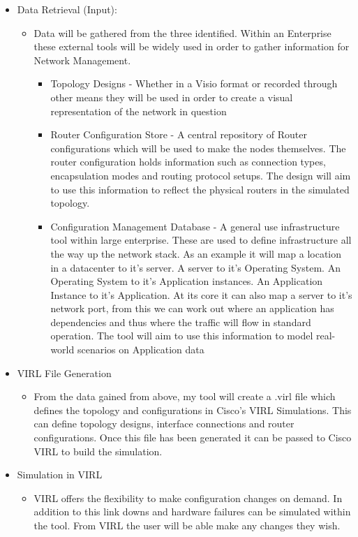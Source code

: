 \documentclass[11pt]{report}
\begin{document}
\begin{itemize}
\item{Data Retrieval (Input):}
  \begin{itemize}
    \item{Data will be gathered from the three identified. Within an Enterprise these external tools will be widely used in order to gather information for Network Management.}
      \begin{itemize}
        \item{Topology Designs - Whether in a Visio format or recorded through other means they will be used in order to create a visual representation of the network in question}
        \item{Router Configuration Store - A central repository of Router configurations which will be used to make the nodes themselves. The router configuration holds information such as connection types, encapsulation modes and routing protocol setups. The design will aim to use this information to reflect the physical routers in the simulated topology.}
        \item{Configuration Management Database - A general use infrastructure tool within large enterprise. These are used to define infrastructure all the way up the network stack. As an example it will map a location in a datacenter to it's server. A server to it's Operating System. An Operating System to it's Application instances. An Application Instance to it's Application. At its core it can also map a server to it's network port, from this we can work out where an application has dependencies and thus where the traffic will flow in standard operation. The tool will aim to use this information to model real-world scenarios on Application data}
      \end{itemize}
  \end{itemize}
  \item{VIRL File Generation}
  \begin{itemize}
    \item{From the data gained from above, my tool will create a .virl file which defines the topology and configurations in Cisco’s VIRL Simulations. This can define topology designs, interface connections and router configurations. Once this file has been generated it can be passed to Cisco VIRL to build the simulation.}
  \end{itemize}
  \item{Simulation in VIRL}
  \begin{itemize}
    \item{VIRL offers the flexibility to make configuration changes on demand. In addition to this link downs and hardware failures can be simulated within the tool. From VIRL the user will be able make any changes they wish.}

\end{itemize}
\end{itemize}
\end{document}
